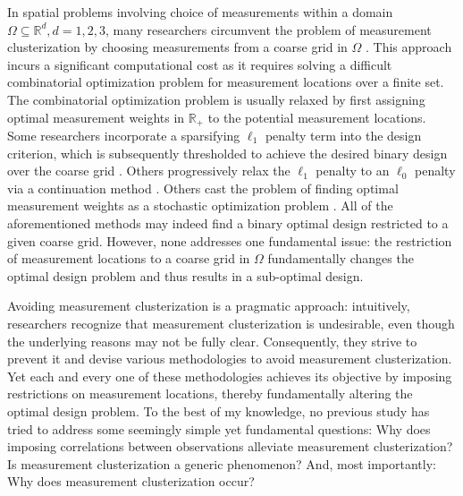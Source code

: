 In spatial problems involving choice of measurements within a domain
\(\Omega \subseteq \mathbb{R}^d, d=1,2,3\), many researchers
circumvent the problem of measurement clusterization by choosing
measurements from a coarse grid in \(\Omega\) \cite{koval2020,
  alexanderian2021, attia2022, alexanderian2014, alexanderian2016,
  alexanderian2018efficient, brunton2016}. This approach incurs a
significant computational cost as it requires solving a difficult
combinatorial optimization problem for measurement locations over a
finite set. The combinatorial optimization problem is usually relaxed
by first assigning optimal measurement weights in \(\mathbb{R}_+\) to
the potential measurement locations. Some researchers incorporate a
sparsifying \(\ell_1\) penalty term into the design criterion, which
is subsequently thresholded to achieve the desired binary design over
the coarse grid \cite{horesh2008borehole}. Others progressively relax
the \(\ell_1\) penalty to an \(\ell_0\) penalty via a continuation
method \cite{alexanderian2016, alexanderian2014}. Others cast the
problem of finding optimal measurement weights as a stochastic
optimization problem \cite{attia2022stochastic}. All of the
aforementioned methods may indeed find a binary optimal design
restricted to a given coarse grid. However, none addresses one
fundamental issue: the restriction of measurement locations to a
coarse grid in \(\Omega\) fundamentally changes the optimal design
problem and thus results in a sub-optimal design.

Avoiding measurement clusterization is a pragmatic approach:
intuitively, researchers recognize that measurement clusterization is
undesirable, even though the underlying reasons may not be fully
clear. Consequently, they strive to prevent it and devise various
methodologies to avoid measurement clusterization. Yet each and every
one of these methodologies achieves its objective by imposing
restrictions on measurement locations, thereby fundamentally altering
the optimal design problem. To the best of my knowledge, no previous
study has tried to address some seemingly simple yet fundamental
questions:
%
Why does imposing correlations between observations alleviate
measurement clusterization?
%
Is measurement clusterization a generic phenomenon?
%
And, most importantly: Why does measurement clusterization occur?
%
%


